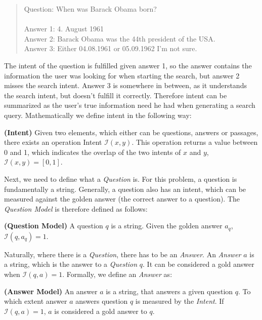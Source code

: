 \begin{quotation}
\noindent Question: When was Barack Obama born? \\\\
Answer 1: 4. August 1961 \\
Answer 2: Barack Obama was the 44th president of the USA. \\
Answer 3: Either 04.08.1961 or 05.09.1962 I'm not sure. 
\end{quotation}

The intent of the question is fulfilled given answer 1, so the answer contains the information the user was looking for when starting the search, but answer 2 misses the search intent. Answer 3 is somewhere in between, as it understands the search intent, but doesn't fulfill it correctly. Therefore intent can be summarized as the user's true information need he had when generating a search query. Mathematically we define intent in the following way:

\begin{definition}
    \textbf{(Intent)} Given two elements, which either can be questions, answers or passages, there exists an operation Intent $\mathcal{I}(x, y)$. This operation returns a value between 0 and 1, which indicates the overlap of the two intents of $x$ and $y$, $\mathcal{I}(x, y) = [0,1]$.
    \label{def:intent}
\end{definition}

Next, we need to define what a \textit{Question} is. For this problem, a question is fundamentally a string. Generally, a question also has an intent, which can be measured against the golden answer (the correct answer to a question). The \textit{Question Model} is therefore defined as follows:

\begin{definition}
    \textbf{(Question Model)} A question $q$ is a string. Given the golden answer $a_q$, $\mathcal{I}(q, a_q) = 1$.
    \label{def:question_model}
\end{definition}

Naturally, where there is a \textit{Question}, there has to be an \textit{Answer}. An \textit{Answer} $a$ is a string, which is the answer to a \textit{Question} $q$. It can be considered a gold answer when $\mathcal{I}(q,a) = 1$. Formally, we define an \textit{Answer} as:

\begin{definition}
    \textbf{(Answer Model)} An answer $a$ is a string, that answers a given question $q$. To which extent answer $a$ answers question $q$ is measured by the \textit{Intent}. If $\mathcal{I}(q,a) = 1$, $a$ is considered a gold answer to $q$.
    \label{def:answer_model}
\end{definition}

